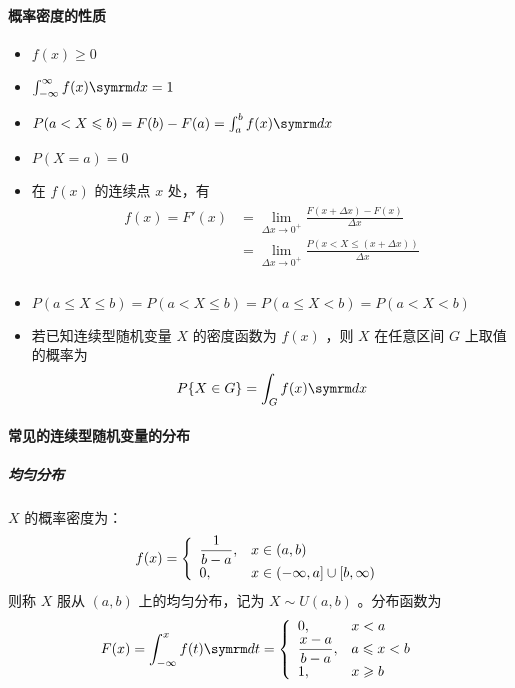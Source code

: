 \paragraph{概率密度的性质}
\begin{itemize}[leftmargin=\paritemindent]
    \item  $ f(x) \geqslant 0 $ 
    \item  $ \int_{-\infty}^\infty f(x) \diff x = 1 $ 
    \item  $ P(a < X \leqslant b) = F(b) - F(a) = \int_a^b f(x) \diff x $
    \item  $ P(X = a) = 0 $ 
    \item 在 $ f(x) $ 的连续点 $ x $ 处，有\begin{align}
        \begin{split}
            f(x) = F'(x)
            & = \lim_{\Delta x \rightarrow 0^+} \frac{F(x + \Delta x) - F(x)}{\Delta x} \\
            & = \lim_{\Delta x \rightarrow 0^+} \frac{P(x < X \leqslant (x + \Delta x))}{\Delta x} \\
        \end{split}
    \end{align}
    \item  $ P(a \leqslant X \leqslant b) = P(a < X \leqslant b) = P(a \leqslant X < b) = P(a < X < b) $ 
    \item 若已知连续型随机变量 $ X $ 的密度函数为 $ f(x) $ ，则 $ X $ 在任意区间 $ G $ 上取值的概率为
    \begin{equation}
        P\{X \in G\} = \int_G f(x) \diff x
    \end{equation}
\end{itemize}

\paragraph{常见的连续型随机变量的分布}

\subparagraph{均匀分布}  $ X $ 的概率密度为：
\begin{equation}
    f(x) = \left\{ \begin{array}{ll}
        \displaystyle{\frac{\displaystyle{1}}{\displaystyle{b-a}}}, & x \in (a,b) \\
        0, & x \in (-\infty, a] \cup [b, \infty)
    \end{array} \right.
\end{equation}
则称 $ X $ 服从 $ (a,b) $ 上的均匀分布，记为 $ X \sim U(a,b) $ 。分布函数为
\begin{equation}
    F(x) = \int_{-\infty}^x f(t) \diff t = \left\{ \begin{array}{ll}
        0, & x < a \\
        \ddfrac{x-a}{b-a}, & a \leqslant x < b  \\
        1, & x \geqslant b
    \end{array} \right.
\end{equation}

